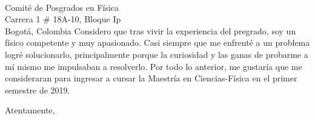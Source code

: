 \documentclass[10pt]{letter} %
\begin{document}
\begin{letter}{\\ Comité de Posgrados en Física \\ Carrera 1 \# 18A-10, Bloque Ip \\ Bogotá, Colombia}
Considero que tras vivir la experiencia del pregrado, soy un físico competente y muy apasionado. Casi siempre que me enfrenté a un problema logré solucionarlo, principalmente porque la curiosidad y las ganas de probarme a mí mismo me impulsaban a resolverlo. Por todo lo anterior, me gustaría que me consideraran para ingresar a cursar la Maestría en Ciencias-Física en el primer semestre de 2019.



\vspace{2\parskip} %
\closing{Atentamente,}
\vspace{2\parskip} %



\end{letter}
 
\end{document}
